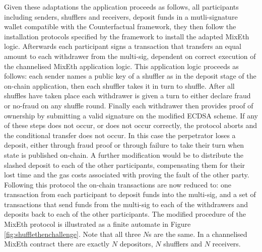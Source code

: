 \documentclass[a4paper]{article}
\theoremstyle{definition}
\begin{document}
Given these adaptations the application proceeds as follows, all participants including senders, shufflers and receivers, deposit funds in a mutli-signature wallet compatible with the Counterfactual framework, they then follow the installation protocols specified by the framework to install the adapted MixEth logic. Afterwards each participant signs a transaction that transfers an equal amount to each withdrawer from the multi-sig, dependent on correct execution of the channelised MixEth application logic. This application logic proceeds as follows: each sender names a public key of a shuffler as in the deposit stage of the on-chain application, then each shuffler takes it in turn to shuffle. After all shuffles have taken place each withdrawer is given a turn to either declare fraud or no-fraud on any shuffle round. Finally each withdrawer then provides proof of ownership by submitting a valid signature on the modified ECDSA scheme. If any of these steps does not occur, or does not occur correctly, the protocol aborts and the conditional transfer does not occur. In this case the perpetrator loses a deposit, either through fraud proof or through failure to take their turn when state is published on-chain. A further modification would be to distribute the slashed deposit to each of the other participants, compensating them for their lost time and the gas costs associated with proving the fault of the other party. Following this protocol the on-chain transactions are now reduced to: one transaction from each participant to deposit funds into the multi-sig, and a set of transactions that send funds from the multi-sig to each of the withdrawers and deposits back to each of the other participants. The modified procedure of the MixEth protocol is illustrated as a finite automate in Figure \ref{fig:shufflethenchallenge}. Note that all three $N$s are the same. In a channelised MixEth contract there are exactly $N$ depositors, $N$ shufflers and $N$ receivers. 
\end{document}
